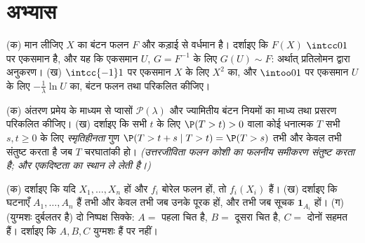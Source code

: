 \section{अभ्यास}

\begin{exercise}[$\star$]\label{exo:b3:probability:1}
(क) मान लीजिए $X$ का बंटन फलन $F$  और कड़ाई से वर्धमान है।
दर्शाइए कि $F(X)$ $\intcc01$ पर एकसमान है, और यह कि एकसमान $U$, $G = F^{-1}$
के लिए $G(U) \sim F$: अर्थात् प्रतिलोमन द्वारा अनुकरण।
(ख) $\intcc{-1}1$ पर एकसमान $X$ के लिए $X^2$ का, और $\intoo01$ पर एकसमान
$U$ के लिए $-\frac1\lambda\ln
U$ का, बंटन फलन तथा  परिकलित कीजिए।
\end{exercise}

\begin{exercise}[$\star$]\label{exo:b3:probability:2}
(क) अंतरण प्रमेय के माध्यम से प्वासों $\mathcal
P(\lambda)$ और ज्यामितीय बंटन नियमों
का माध्य तथा प्रसरण परिकलित कीजिए।
(ख) दर्शाइए कि सभी $t$ के लिए $\P(T > t)
> 0$ वाला कोई धनात्मक  $T$ सभी $s, t \geq 0$ के लिए \emph{स्मृतिहीनता} गुण $\P(T > t + s \mid
T > t) = \P(T > s)$ तभी और केवल
तभी संतुष्ट करता है जब $T$ चरघातांकी हो। \emph{(उत्तरजीविता फलन
कोशी का फलनीय समीकरण संतुष्ट करता है; और एकदिष्टता  का स्थान
ले लेती है।)}
\end{exercise}

\begin{exercise}[$\star\star$]\label{exo:b3:probability:3}
(क) दर्शाइए कि यदि $X_1, \dots, X_n$  हों और $f_i$ बोरेल फलन हों, तो
$f_i(X_i)$  हैं।
(ख) दर्शाइए कि घटनाएँ $A_1, \dots, A_n$  हैं तभी और केवल तभी जब उनके
पूरक  हों, और तभी जब सूचक $\mathbf 1_{A_i}$   हों।
(ग) (युग्मशः  दुर्बलतर है) दो निष्पक्ष सिक्के: $A ={}$
पहला चित है, $B ={}$ दूसरा चित है, $C ={}$ दोनों सहमत हैं। दर्शाइए कि
$A, B, C$ युग्मशः  हैं पर  नहीं।
\end{exercise}

